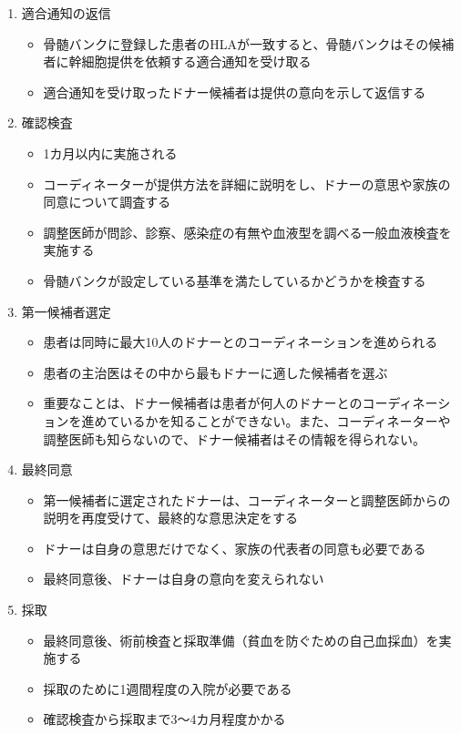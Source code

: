 \documentclass[
  a4paperpaper,
]{article}
\providecommand{\tightlist}{%
  \setlength{\itemsep}{0pt}\setlength{\parskip}{0pt}}\usepackage{longtable,booktabs,array}
\begin{document}
\begin{enumerate}
\def\labelenumi{\arabic{enumi}.}
\tightlist
\item
  適合通知の返信

  \begin{itemize}
  \tightlist
  \item
    骨髄バンクに登録した患者のHLAが一致すると、骨髄バンクはその候補者に幹細胞提供を依頼する適合通知を受け取る
  \item
    適合通知を受け取ったドナー候補者は提供の意向を示して返信する
  \end{itemize}
\item
  確認検査

  \begin{itemize}
  \tightlist
  \item
    1カ月以内に実施される
  \item
    コーディネーターが提供方法を詳細に説明をし、ドナーの意思や家族の同意について調査する
  \item
    調整医師が問診、診察、感染症の有無や血液型を調べる一般血液検査を実施する
  \item
    骨髄バンクが設定している基準を満たしているかどうかを検査する
  \end{itemize}
\item
  第一候補者選定

  \begin{itemize}
  \tightlist
  \item
    患者は同時に最大10人のドナーとのコーディネーションを進められる
  \item
    患者の主治医はその中から最もドナーに適した候補者を選ぶ
  \item
    重要なことは、ドナー候補者は患者が何人のドナーとのコーディネーションを進めているかを知ることができない。また、コーディネーターや調整医師も知らないので、ドナー候補者はその情報を得られない。
  \end{itemize}
\item
  最終同意

  \begin{itemize}
  \tightlist
  \item
    第一候補者に選定されたドナーは、コーディネーターと調整医師からの説明を再度受けて、最終的な意思決定をする
  \item
    ドナーは自身の意思だけでなく、家族の代表者の同意も必要である
  \item
    最終同意後、ドナーは自身の意向を変えられない
  \end{itemize}
\item
  採取

  \begin{itemize}
  \tightlist
  \item
    最終同意後、術前検査と採取準備（貧血を防ぐための自己血採血）を実施する
  \item
    採取のために1週間程度の入院が必要である
  \item
    確認検査から採取まで3～4カ月程度かかる
  \end{itemize}
\end{enumerate}
\end{document}
